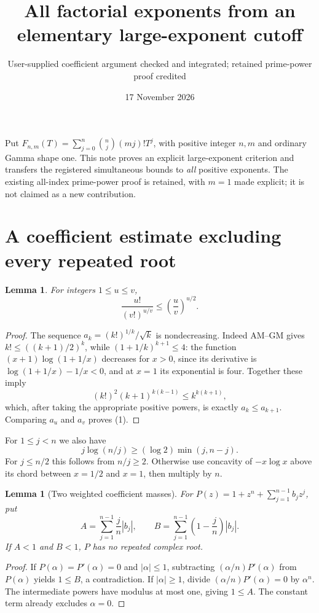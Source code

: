 \documentclass[11pt]{article}
\title{All factorial exponents from an elementary large-exponent cutoff}
\author{User-supplied coefficient argument checked and integrated; retained prime-power proof credited}
\date{17 November 2026}
\newtheorem{lemma}[theorem]{Lemma}
\begin{document}
\maketitle
Put $F_{n,m}(T)=\sum_{j=0}^n\binom nj(mj)!T^j$, with positive integer
$n,m$ and ordinary Gamma shape one. This note proves an explicit
large-exponent criterion and transfers the registered simultaneous bounds
to \emph{all} positive exponents. The existing all-index prime-power proof
is retained, with $m=1$ made explicit; it is not claimed as a new contribution.

\section{A coefficient estimate excluding every repeated root}
\begin{lemma}\label{lem:factorial}
For integers $1\le u\le v$,
\[
 \frac{u!}{(v!)^{u/v}}\le\left(\frac uv\right)^{u/2}. \tag{1}
\]
\end{lemma}
\begin{proof}
The sequence $a_k=(k!)^{1/k}/\sqrt k$ is nondecreasing.
Indeed AM--GM gives $k!\le((k+1)/2)^k$, while
$(1+1/k)^{k+1}\le4$: the function
$(x+1)\log(1+1/x)$ decreases for $x>0$, since its derivative is
$\log(1+1/x)-1/x<0$, and at $x=1$ its exponential is four.
Together these imply
\[
 (k!)^2(k+1)^{k(k-1)}\le k^{k(k+1)},
\]
which, after taking the appropriate positive powers, is exactly
$a_k\le a_{k+1}$. Comparing $a_u$ and $a_v$ proves (1).
\end{proof}

For $1\le j<n$ we also have
\[
 j\log(n/j)\ge(\log2)\min(j,n-j). \tag{2}
\]
For $j\le n/2$ this follows from $n/j\ge2$.
Otherwise use concavity of $-x\log x$ above its chord between
$x=1/2$ and $x=1$, then multiply by $n$.

\begin{lemma}[Two weighted coefficient masses]\label{lem:masses}
For $P(z)=1+z^n+\sum_{j=1}^{n-1}b_jz^j$, put
\[
 A=\sum_{j=1}^{n-1}\frac jn|b_j|,\qquad
 B=\sum_{j=1}^{n-1}\left(1-\frac jn\right)|b_j|.
\]
If $A<1$ and $B<1$, $P$ has no repeated complex root.
\end{lemma}
\begin{proof}
If $P(\alpha)=P'(\alpha)=0$ and $|\alpha|\le1$, subtracting
$(\alpha/n)P'(\alpha)$ from $P(\alpha)$ yields $1\le B$, a contradiction.
If $|\alpha|\ge1$, divide $(\alpha/n)P'(\alpha)=0$ by $\alpha^n$.
The intermediate powers have modulus at most one, giving $1\le A$.
The constant term already excludes $\alpha=0$.
\end{proof}
\end{document}
